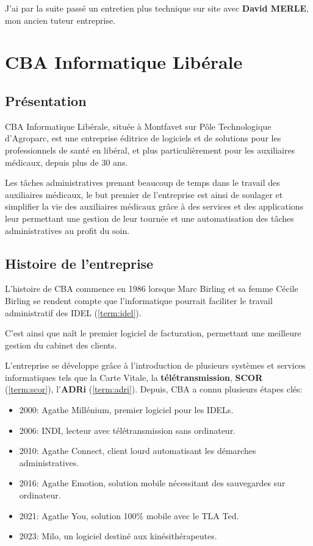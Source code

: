 \documentclass{article}
\begin{document}
J'ai par la suite passé un entretien plus technique sur site avec \textbf{David MERLE}, mon ancien tuteur entreprise.

\newpage

\section{CBA Informatique Libérale}
\subsection{Présentation}

CBA Informatique Libérale, située à Montfavet sur Pôle Technologique d'Agroparc, est une entreprise éditrice de logiciels et de solutions pour les professionnels de santé en libéral, et plus particulièrement pour les auxiliaires médicaux, depuis plus de 30 ans.

Les tâches administratives prenant beaucoup de temps dans le travail des auxiliaires médicaux, le but premier de l'entreprise est ainsi de soulager et simplifier la vie des auxiliaires médicaux grâce à des services et des applications leur permettant une gestion de leur tournée et une automatisation des tâches administratives au profit du soin.

\subsection{Histoire de l'entreprise}

L'histoire de CBA commence en 1986 lorsque Marc Birling et sa femme Cécile Birling se rendent compte que l'informatique pourrait faciliter le travail administratif des IDEL (\ref{term:idel}).

C'est ainsi que naît le premier logiciel de facturation, permettant une meilleure gestion du cabinet des clients.

L'entreprise se développe grâce à l'introduction de plusieurs systèmes et services informatiques tels que la Carte Vitale, la \textbf{télétransmission}, \textbf{SCOR} (\ref{term:scor}), l'\textbf{ADRi} (\ref{term:adri}). Depuis, CBA a connu plusieurs étapes clés:

\begin{itemize}
    \item 2000: Agathe Millénium, premier logiciel pour les IDELs.
    \item 2006: INDI, lecteur avec télétransmission sans ordinateur.
    \item 2010: Agathe Connect, client lourd automatisant les démarches administratives.
    \item 2016: Agathe Emotion, solution mobile nécessitant des sauvegardes sur ordinateur.
    \item 2021: Agathe You, solution 100\% mobile avec le TLA Ted.
    \item 2023: Milo, un logiciel destiné aux kinésithérapeutes.
\end{itemize}
\end{document}
